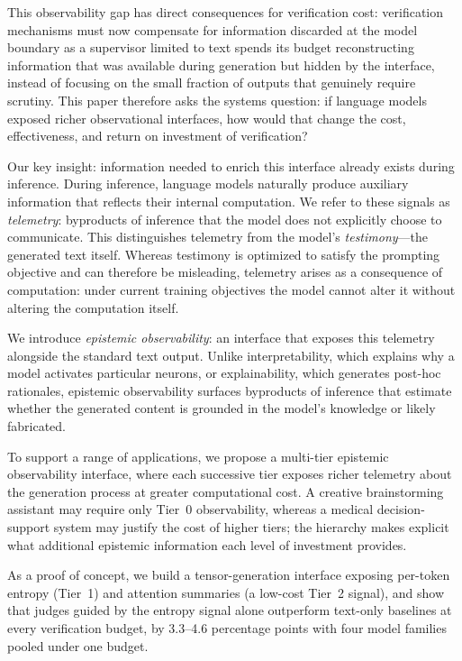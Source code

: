 This observability gap has direct consequences for verification cost:
verification mechanisms must now compensate for information discarded at the model boundary
as a supervisor limited to text spends its budget reconstructing information that
was available during generation but hidden by the interface, instead of
focusing on the small fraction of outputs that genuinely require scrutiny.
This paper therefore asks the systems question: if language models exposed
richer observational interfaces, how would that change the cost,
effectiveness, and return on investment of verification?

Our key insight: information needed to enrich this interface already exists during inference.
During inference, language models naturally produce auxiliary information that reflects their internal computation.
We refer to these signals as \emph{telemetry}: byproducts of inference that the model does not explicitly choose to communicate.
This distinguishes telemetry from the model's \emph{testimony}---the generated text itself.
Whereas testimony is optimized to satisfy the prompting objective and can therefore be misleading,
telemetry arises as a consequence of computation: under current training objectives the model
cannot alter it without altering the computation itself.


We introduce \emph{epistemic observability}: an interface that exposes this
telemetry alongside the standard text output.
Unlike interpretability, which explains why a model activates particular
neurons, or explainability, which generates post-hoc rationales, epistemic
observability surfaces byproducts of inference that estimate whether the
generated content is grounded in the model's knowledge or likely fabricated.

To support a range of applications, we propose a multi-tier
epistemic observability interface, where each successive tier exposes richer
telemetry about the generation process at greater computational cost.
A creative brainstorming assistant may require only Tier~0 observability,
whereas a medical decision-support system may justify the cost of higher
tiers; the hierarchy makes explicit what additional epistemic information
each level of investment provides.

As a proof of concept, we build a tensor-generation interface exposing
per-token entropy (Tier~1) and attention summaries (a low-cost Tier~2 signal),
and show that judges guided by the entropy signal alone outperform text-only
baselines at every verification budget, by 3.3--4.6 percentage points with four
model families pooled under one budget.

